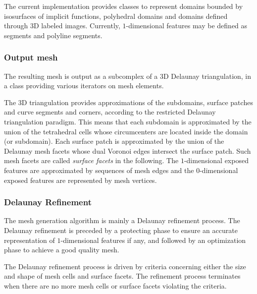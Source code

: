 The current implementation provides  classes to represent
domains bounded by isosurfaces of implicit functions, polyhedral domains
and domains defined through 3D labeled images. 
Currently,  $1$-dimensional features may be defined as segments and polyline segments.


\subsubsection{Output mesh}

The resulting mesh is output as a subcomplex of a 3D Delaunay triangulation,
in a class  providing various iterators
on mesh elements.

 The 3D triangulation provides approximations of the
subdomains, surface patches and curve segments
and corners, according to the restricted
Delaunay triangulation paradigm. This means that each subdomain
 is approximated by the union of  the tetrahedral cells
 whose circumcenters are located inside the domain
(or subdomain). 
Each surface patch  is approximated 
by the union of   the Delaunay mesh  facets whose dual Voronoi edges intersect the surface patch.
Such mesh  facets are called {\em surface facets}  in the following. 
The $1$-dimensional exposed features are approximated by  sequences of  mesh edges
and  the $0$-dimensional exposed features are represented by mesh vertices.



\subsubsection{Delaunay Refinement}
\label{introsec:param}

The mesh generation algorithm is  mainly a Delaunay refinement process.
The Delaunay refinement is 
preceded by a protecting phase to ensure an accurate representation
of $1$-dimensional features if any,
and  followed by an optimization  phase to achieve a good quality mesh.

The   Delaunay refinement process is driven by criteria
concerning either the size and shape of  mesh cells 
and surface facets.
The refinement process terminates when there are
no more mesh cells or  surface facets violating the  criteria.


